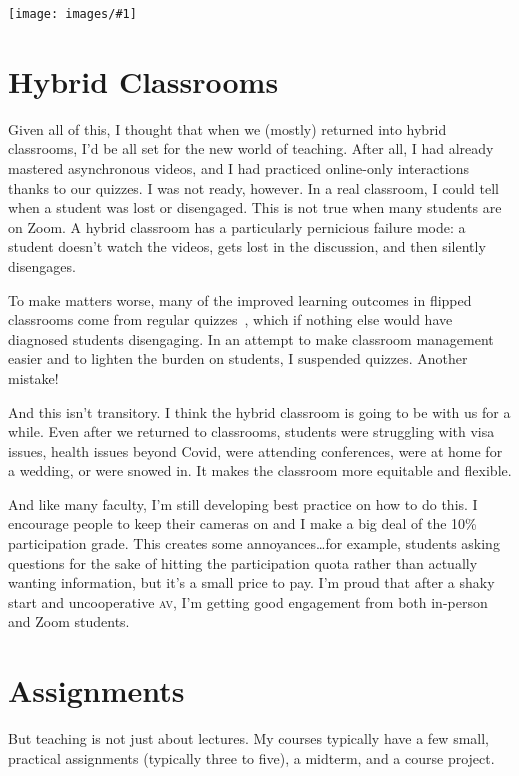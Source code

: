 \documentclass[11pt]{amsart}
\newcommand{\abr}[1]{\textsc{#1}}
\newcommand{\image}[2]{  \begin{center}
\texttt{[image: images/\#1]}
\end{center}
  }
\begin{document}
\image{efficient_qa}{}

\section{Hybrid Classrooms}

Given all of this, I thought that when we (mostly) returned into
hybrid classrooms, I’d be all set for the new world of teaching.
After all, I had already mastered asynchronous videos, and I had
practiced online-only interactions thanks to our quizzes.  I was not
ready, however.  In a real classroom, I could tell when a student was lost or
disengaged.  This is not true when many students are on Zoom.  A
hybrid classroom has a particularly pernicious failure mode: a student
doesn’t watch the videos, gets lost in the discussion, and then
silently disengages.

To make matters worse, many of the improved learning outcomes in
flipped classrooms come from regular quizzes~\cite{tune-13}, which if
nothing else would have diagnosed students disengaging. In an attempt
to make classroom management easier and to lighten the burden on
students, I suspended quizzes.  Another mistake!

And this isn’t transitory.  I think the hybrid classroom is going to
be with us for a while.  Even after we returned to classrooms,
students were struggling with visa issues, health issues beyond Covid,
were attending conferences, were at home for a wedding, or were snowed
in.  It makes the classroom more equitable and flexible.

And like many faculty, I’m still developing best practice on how to do
this.  I encourage people to keep their cameras on and I make a big
deal of the 10\% participation grade.  This creates some
annoyances\dots for example, students asking questions for the sake of
hitting the participation quota rather than actually wanting
information, but it’s a small price to pay.  I’m proud that after a
shaky start and uncooperative \abr{av}, I’m getting good engagement
from both in-person and Zoom students.

\section{Assignments}

But teaching is not just about lectures.  My courses typically have a
few small, practical assignments (typically three to five), a midterm,
and a course project.
\end{document}
